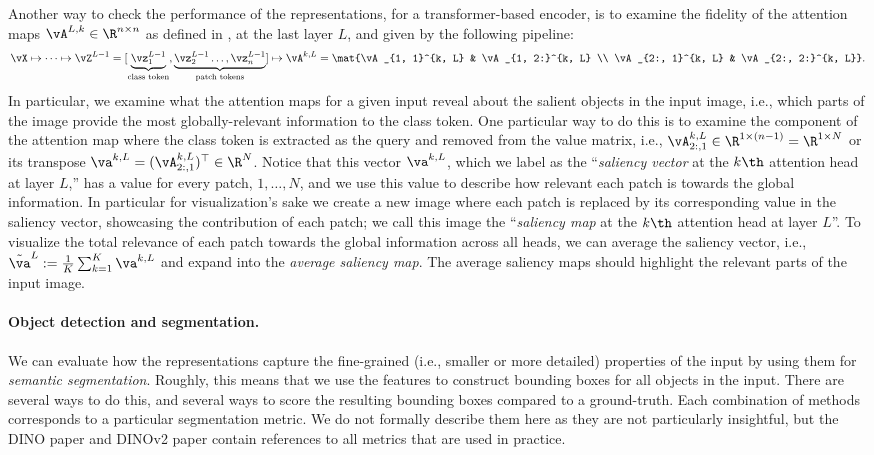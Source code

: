 \documentclass[../../book-main.tex]{subfiles}
\begin{document}
Another way to check the performance of the representations, for a transformer-based encoder, is to examine the fidelity of the attention maps \(\vA^{L, k} \in \R^{n \times n}\) as defined in , at the last layer \(L\), and given by the following pipeline:
\begin{align}
    \vX \mapsto \cdots \mapsto \vZ^{L - 1} = [\underbrace{\vz_{1}^{L - 1}}_{\text{class token}}, \underbrace{\vz_{2}^{L - 1} \dots, \vz_{n}^{L - 1}}_{\text{patch tokens}}] \mapsto \vA^{k, L} = \mat{\vA_{1, 1}^{k, L} & \vA_{1, 2:}^{k, L} \\ \vA_{2:, 1}^{k, L} & \vA_{2:, 2:}^{k, L}}.
\end{align}
In particular, we examine what the attention maps for a given input reveal about the salient objects in the input image, i.e., which parts of the image provide the most globally-relevant information to the class token. One particular way to do this is to examine the component of the attention map where the class token is extracted as the query and removed from the value matrix, i.e., \(\vA_{2:, 1}^{k, L} \in \R^{1 \times (n - 1)} = \R^{1 \times N}\) or its transpose \(\va^{k, L} = (\vA_{2:, 1}^{k, L})^{\top} \in \R^{N}\). Notice that this vector \(\va^{k, L}\), which we label as the ``\textit{saliency vector} at the \(k\th\) attention head at layer \(L\),'' has a value for every patch, \(1, \dots, N\), and we use this value to describe how relevant each patch is towards the global information. In particular for visualization's sake we create a new image where each patch is replaced by its corresponding value in the saliency vector, showcasing the contribution of each patch; we call this image the ``\textit{saliency map} at the \(k\th\) attention head at layer \(L\)''. To visualize the total relevance of each patch towards the global information across all heads, we can average the saliency vector, i.e., \(\tilde{\va}^{L} := \frac{1}{K}\sum_{k = 1}^{K}\va^{k, L}\) and expand into the \textit{average saliency map}. The average saliency maps should highlight the relevant parts of the input image.


\paragraph{Object detection and segmentation.}

We can evaluate how the representations capture the fine-grained (i.e., smaller or more detailed) properties of the input by using them for \textit{semantic segmentation}. Roughly, this means that we use the features to construct bounding boxes for all objects in the input. There are several ways to do this, and several ways to score the resulting bounding boxes compared to a ground-truth. Each combination of methods corresponds to a particular segmentation metric. We do not formally describe them here as they are not particularly insightful, but the DINO paper \citep{caron2021emerging} and DINOv2 paper \citep{oquab2023dinov2} contain references to all metrics that are used in practice.
\end{document}
